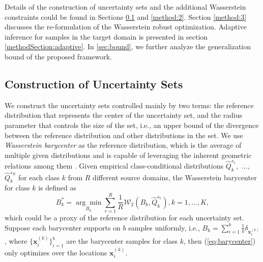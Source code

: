 \documentclass[journal]{IEEEtran}
\begin{document}
Details of the construction of uncertainty sets and the additional Wasserstein constraints could be found in Sections \ref{method:1} and \ref{method:2}. Section \ref{method:3} discusses the re-formulation of the Wasserstein robust optimization. Adaptive inference for samples in the target domain is presented in section \ref{methodSection:adaptive}. In \ref{sec:bound}, we further analyze the generalization bound of the proposed framework.



\subsection{Construction of Uncertainty Sets}\label{method:1}
We construct the uncertainty sets controlled 
mainly by two terms: the reference distribution that represents the center of the uncertainty set,
and the radius parameter that controls the size of the set, i.e., an upper bound of the divergence between the reference distribution and other distributions in the set. 
We use {\it Wasserstein barycenter} \cite{rabin2011wasserstein}  as the reference distribution, which is the average of multiple given distributions and is capable of leveraging the inherent geometric relations among them \cite{zhou2020domain}. Given empirical class-conditional distributions $\widehat{Q}^{s_1}_k,$ $\ldots,$ $\widehat{Q}^{s_R}_k$ for each class $k$ from $R$ different source domains, the Wasserstein barycenter for class $k$ is defined as
\begin{equation} 
B^{*}_k= \underset{B_k}{\arg \min }\sum_{r=1}^{R} \frac{1}{R} \mathcal{W}_2( B_k,\widehat{Q}^{s_r}_k), k = 1,\ldots, K,
\label{eq:barycenter}
\end{equation}
which could be a proxy of the reference distribution for each uncertainty set. 
Suppose each barycenter supports on $b$ samples uniformly, i.e., $B_k= \sum_{i=1}^{b}\frac{1}{b} \delta_{\boldsymbol{x}_i^{(k)}}$, where $\{\boldsymbol{x}_i^{(k)}\}_{i=1}^{b}$ are the barycenter samples for class $k$,
then (\ref{eq:barycenter}) only optimizes over the locations $\boldsymbol{x}_i^{(k)}$.
\end{document}
